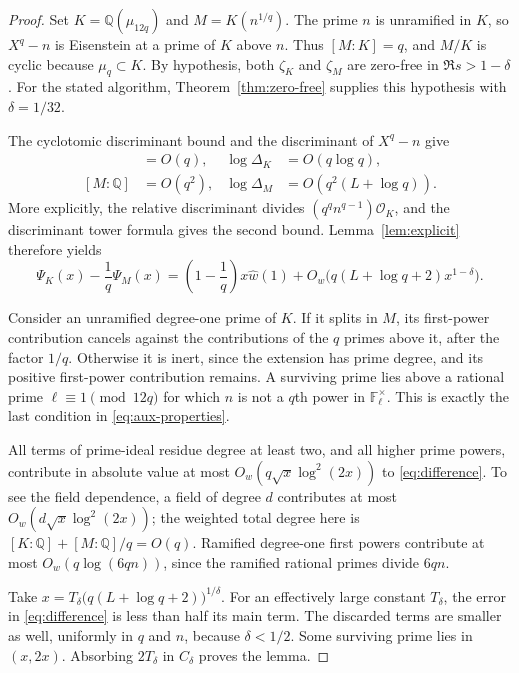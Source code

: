 \documentclass[11pt]{article}
\theoremstyle{definition}
\theoremstyle{remark}
\newcommand{\Q}{\mathbb Q}
\newcommand{\F}{\mathbb F}
\begin{document}
\begin{proof}
Set $K=\Q(\mu_{12q})$ and $M=K(n^{1/q})$. The prime $n$ is
unramified in $K$, so $X^q-n$ is Eisenstein at a prime of $K$
above $n$. Thus $[M:K]=q$, and $M/K$ is cyclic because
$\mu_q\subset K$. By hypothesis, both $\zeta_K$ and $\zeta_M$
are zero-free in $\Re s>1-\delta$. For the stated algorithm,
Theorem~\ref{thm:zero-free} supplies this hypothesis with
$\delta=1/32$.

The cyclotomic discriminant bound and the discriminant of $X^q-n$
give
\begin{align*}
 [K:\Q]&=O(q),& \log\Delta_K&=O(q\log q),\\
 [M:\Q]&=O(q^2),& \log\Delta_M&=O(q^2(L+\log q)).
\end{align*}
More explicitly, the relative discriminant divides
$(q^q n^{q-1})\mathcal O_K$, and the discriminant tower formula
gives the second bound. Lemma~\ref{lem:explicit} therefore yields
\begin{equation}\label{eq:difference}
 \Psi_K(x)-\frac1q\Psi_M(x)
 =\left(1-\frac1q\right)x\widehat w(1)
 +O_w\bigl(q(L+\log q+2)x^{1-\delta}\bigr).
\end{equation}

Consider an unramified degree-one prime of $K$. If it splits in
$M$, its first-power contribution cancels against the contributions
of the $q$ primes above it, after the factor $1/q$. Otherwise it
is inert, since the extension has prime degree, and its positive
first-power contribution remains. A surviving prime lies above a
rational prime $\ell\equiv1\pmod{12q}$ for which $n$ is not a
$q$th power in $\F_\ell^\times$. This is exactly the last
condition in \eqref{eq:aux-properties}.

All terms of prime-ideal residue degree at least two, and all
higher prime powers, contribute in absolute value at most
$O_w(q\sqrt{x}\log^2(2x))$ to \eqref{eq:difference}. To see the
field dependence, a field of degree $d$ contributes at most
$O_w(d\sqrt{x}\log^2(2x))$; the weighted total degree here is
$[K:\Q]+[M:\Q]/q=O(q)$. Ramified degree-one first powers
contribute at most $O_w(q\log(6qn))$, since the ramified rational
primes divide $6qn$.

Take
$x=T_\delta\bigl(q(L+\log q+2)\bigr)^{1/\delta}$.
For an effectively large constant $T_\delta$, the error in
\eqref{eq:difference} is less than half its main term. The
discarded terms are smaller as well, uniformly in $q$ and $n$,
because $\delta<1/2$. Some surviving prime lies in $(x,2x)$.
Absorbing $2T_\delta$ in $C_\delta$ proves the lemma.
\end{proof}
\end{document}
